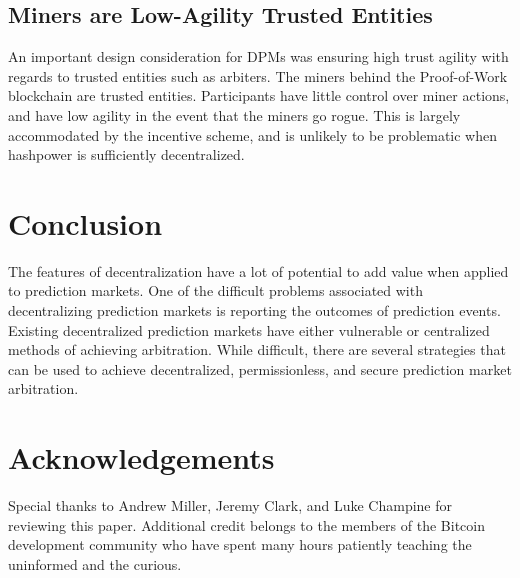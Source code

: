 \documentclass[onecolumn]{article}
\begin{document}
\subsection{Miners are Low-Agility Trusted Entities}
An important design consideration for DPMs was ensuring high trust agility with regards to trusted entities such as arbiters.
The miners behind the Proof-of-Work blockchain are trusted entities.
Participants have little control over miner actions, and have low agility in the event that the miners go rogue.
This is largely accommodated by the incentive scheme, and is unlikely to be problematic when hashpower is sufficiently decentralized.

\section{Conclusion}
The features of decentralization have a lot of potential to add value when applied to prediction markets.
One of the difficult problems associated with decentralizing prediction markets is reporting the outcomes of prediction events.
Existing decentralized prediction markets have either vulnerable or centralized methods of achieving arbitration.
While difficult, there are several strategies that can be used to achieve decentralized, permissionless, and secure prediction market arbitration.

\section{Acknowledgements}
Special thanks to Andrew Miller, Jeremy Clark, and Luke Champine for reviewing this paper.
Additional credit belongs to the members of the Bitcoin development community who have spent many hours patiently teaching the uninformed and the curious.
\end{document}
